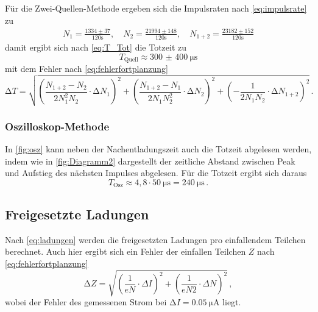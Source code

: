 Für die Zwei-Quellen-Methode ergeben sich die Impulsraten nach \autoref{eq:impulsrate} zu
\begin{align*}
    N_{1}   =\frac{1334 \pm 37}{120 \mathrm{s}}, \quad 
    N_{2}   =\frac{21994 \pm 148}{120 \mathrm{s}}, \quad 
    N_{1+2} =\frac{23182 \pm 152}{120 \mathrm{s}}
\end{align*}
damit ergibt sich nach \autoref{eq:T_Tot} die Totzeit zu
\begin{equation}
    T_\text{Quell} \approx \qty{300(400)}{\micro\second}
\end{equation}
mit dem Fehler nach \autoref{eq:fehlerfortplanzung}
\begin{equation*}
    \increment T  = \sqrt{
      \left(\frac{N_{1+2}-N_{2}}{2 N_{1}^{2} N_{2}} \cdot \increment N_{1}\right)^{2} 
    + \left(\frac{N_{1+2}-N_{1}}{2 N_{1} N_{2}^{2}} \cdot \increment N_{2}\right)^{2} 
    + \left(-\frac{1}{2 N_{1} N_{2}} \cdot \increment N_{1+2}\right)^{2}
    } \, .
\end{equation*}

\subsubsection*{Oszilloskop-Methode}

In \autoref{fig:osz} kann neben der Nachentladungszeit auch die Totzeit abgelesen werden, 
indem wie in \autoref{fig:Diagramm2} dargestellt der zeitliche Abstand zwischen Peak und Aufstieg
des nächsten Impulses abgelesen. Für die Totzeit ergibt sich daraus
\begin{equation*}
    T_\text{Osz} \approx 4,8 \cdot \qty{50}{\micro\second} = \qty{240}{\micro\second} \, .
\end{equation*}


\subsection{Freigesetzte Ladungen}

Nach \autoref{eq:ladungen} werden die freigesetzten Ladungen pro einfallendem Teilchen berechnet.
Auch hier ergibt sich ein Fehler der einfallen Teilchen $Z$ nach \autoref{eq:fehlerfortplanzung}
\begin{equation*}
    \increment Z 
    = \sqrt{\left(\frac{1}{e N} \cdot \Delta I\right)^{2}+\left(\frac{1}{e N 2} \cdot \Delta N\right)^{2}} \, ,
\end{equation*}
wobei der Fehler des gemessenen Strom bei $\increment I = \qty{0.05}{\micro\ampere}$ liegt.

